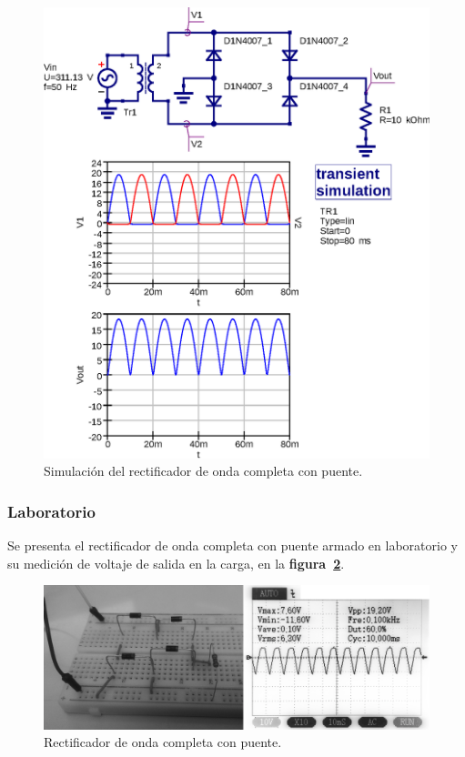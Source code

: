 \begin{figure}[!h]
\centering
\includegraphics[scale=0.75]{simulacion/04.onda_completa1.eps}
\caption{Simulación del rectificador de onda completa con puente.}
\label{simulacion04}
\end{figure}

\subsubsection{Laboratorio}
Se presenta el rectificador de onda completa con puente armado en laboratorio y
su medición de voltaje de salida en la carga, en la
\textbf{figura~\ref{laboratorio06}}.

\begin{figure}[!h]
\centering
\includegraphics[scale=0.34]{fotos/04.onda_completa1.eps}
\caption{Rectificador de onda completa con puente.}
\label{laboratorio06}
\end{figure}

